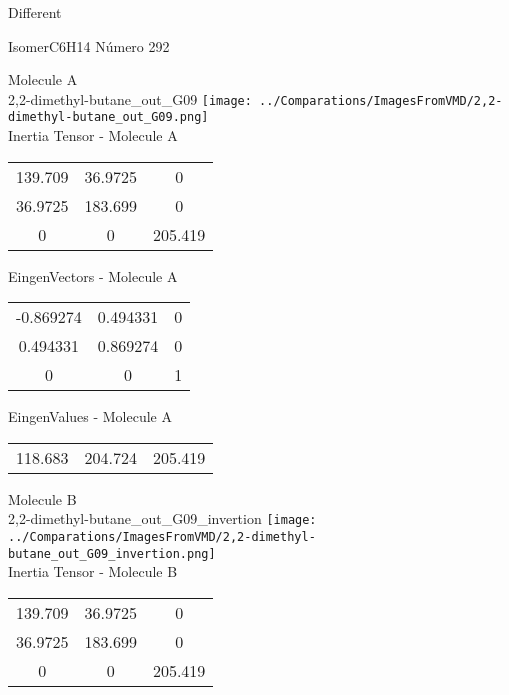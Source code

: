 \begin{center}
\vtab
\vtab
\textcolor{NavyBlue}{\Large Different}
\end{center}

 \newpage

\vtab[-2cm]
\begin{center}
{\large IsomerC6H14 \tab Número 292}
\end{center}
\begin{multicols}{2}
\begin{center}

Molecule A \\ 
2,2-dimethyl-butane\_out\_G09
\texttt{[image: ../Comparations/ImagesFromVMD/2,2-dimethyl-butane\_out\_G09.png]}
\\
Inertia Tensor - Molecule A \\
\vtab

\begin{tabular}{|c c c|}
139.709	 & 	36.9725	 & 	0	 \\
36.9725	 & 	183.699	 & 	0	 \\
0	 & 	0	 & 	205.419
\end{tabular}

\vtab
 EingenVectors - Molecule A     \\
\vtab
\begin{tabular}{|c c c|}
-0.869274	 & 	0.494331	 & 	0	 \\
0.494331	 & 	0.869274	 & 	0	 \\
0	 & 	0	 & 	1
\end{tabular}

\vtab
 EingenValues - Molecule A     \\
\vtab
\begin{tabular}{|c c c|}
118.683	 & 	204.724	 & 	205.419	 \\
\end{tabular}
\columnbreak

Molecule B \\ 
2,2-dimethyl-butane\_out\_G09\_invertion
\texttt{[image: ../Comparations/ImagesFromVMD/2,2-dimethyl-butane\_out\_G09\_invertion.png]}
\\
Inertia Tensor - Molecule B \\
\vtab

\begin{tabular}{|c c c|}
139.709	 & 	36.9725	 & 	0	 \\
36.9725	 & 	183.699	 & 	0	 \\
0	 & 	0	 & 	205.419
\end{tabular}


\end{center}
\end{multicols}
